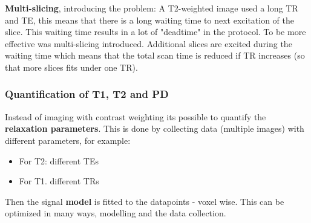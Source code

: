 		\textbf{Multi-slicing}, introducing the problem: A T2-weighted image used a long TR and TE, this means that there is a long waiting time to next excitation of the slice. This waiting time results in a lot of "deadtime" in the protocol. To be more effective was multi-slicing introduced. Additional slices are excited during the waiting time which means that the total scan time is reduced if TR increases (so that more slices fits under one TR).

		\subsubsection{Quantification of T1, T2 and PD}
		Instead of imaging with contrast weighting its possible to quantify the \textbf{relaxation parameters}. This is done by collecting data (multiple images) with different parameters, for example:

			\begin{itemize}
				\item For T2: different TEs
				\item For T1. different TRs 
			\end{itemize}

		 Then the signal \textbf{model} is fitted to the datapoints - voxel wise. This can be optimized in many ways, modelling and the data collection.  


		    
		

		          
		
		

		
			







	